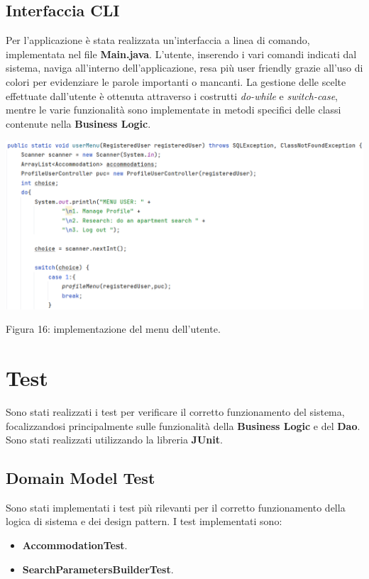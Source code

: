 \documentclass[10pt]{article}
\begin{document}
\subsection{Interfaccia CLI}

Per l'applicazione \`e stata realizzata un'interfaccia a linea di comando, implementata nel file \textbf{Main.java}. L'utente, inserendo i vari comandi indicati dal sistema, naviga all'interno dell'applicazione, resa pi\`u user friendly grazie all'uso di colori per evidenziare le parole importanti o mancanti. La gestione delle scelte effettuate dall'utente \`e ottenuta attraverso i costrutti \textit{do-while} e \textit{switch-case}, mentre le varie funzionalit\`a sono implementate in metodi specifici delle classi contenute nella \textbf{Business Logic}.

\begin{center}
\hspace*{-0.75cm}
\includegraphics[scale=0.6]{cli/usermenu}
\par\medskip
Figura 16: implementazione del menu dell'utente.
\par\medskip
\end{center} 

\section{Test}

Sono stati realizzati i test per verificare il corretto funzionamento del sistema, focalizzandosi principalmente sulle funzionalit\`a della \textbf{Business Logic} e del \textbf{Dao}. Sono stati realizzati utilizzando la libreria \textbf{JUnit}. 

\subsection{Domain Model Test}

Sono stati implementati i test pi\`u rilevanti per il corretto funzionamento della logica di sistema e dei design pattern.
I test implementati sono: 
\begin{itemize}
\item \textbf{AccommodationTest}.
\item \textbf{SearchParametersBuilderTest}.
\end{itemize}
\end{document}
